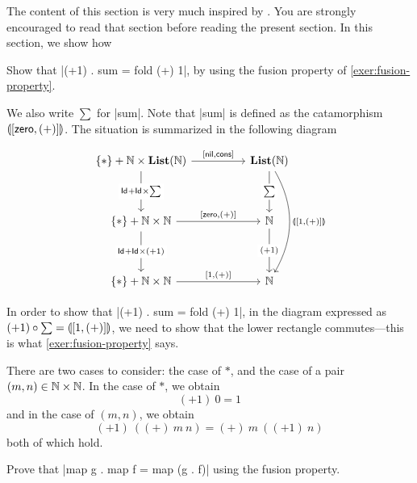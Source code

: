 \begin{reading*}
  The content of this section is very much inspired by \cite[\S3.2]{DBLP:journals/jfp/Hutton99}.
  You are strongly encouraged to read that section before reading the present section.
  In this section, we show how 
\end{reading*}

\begin{exer}
  Show that |(+1) . sum = fold (+) 1|, by using the fusion property of \cref{exer:fusion-property}.
\end{exer}

\begin{solution}
  We also write $\sum$ for |sum|. Note that |sum| is defined as the catamorphism $\llparenthesis [\mathsf{zero}, (+)] \rrparenthesis$.
  The situation is summarized in the following diagram
  
  \[
    \begin{tikzcd}[row sep = huge, column sep = huge]
      \{*\} + \NN \times \List(\NN)
      \ar[d, "\Id + \Id \times \sum" description]
      \ar[r, "{[\nil, \cons]}"]
      &
      \List(\NN)
      \ar[d, "\sum" description]
      \ar[dd, bend left, "\catam{[1, (+)]}"]
      \\
      \{*\} + \NN \times \NN
      \ar[r, "{[\Zero, (+)]}"]
      \ar[d, "{\Id + \Id \times (+1)}" description]
      &
      \NN
      \ar[d, "{(+1)}" description]
      \\
      \{*\} + \NN \times \NN
      \ar[r, "{[1, (+)]}"]
      &
      \NN 
    \end{tikzcd}
  \]

  In order to show that |(+1) . sum = fold (+) 1|, in the diagram expressed as $(+1) \circ \sum = \llparenthesis [1, (+)] \rrparenthesis$, we need to show that the lower rectangle commutes---this is what  \cref{exer:fusion-property} says.

  There are two cases to consider: the case of $*$, and the case of a pair $(m,n) \in \mathbb{N}\times\mathbb{N}$.
  In the case of $*$, we obtain
  \[
    (+1)~0 = 1
  \]
  and in the case of $(m,n)$, we obtain
  \[
    (+1)~ ((+)~ m~ n) = (+)~ m~ ((+1)~n)
  \]
  both of which hold.
  
\end{solution}

\begin{exer}
  Prove that |map g . map f = map (g . f)| using the fusion property.
\end{exer}


